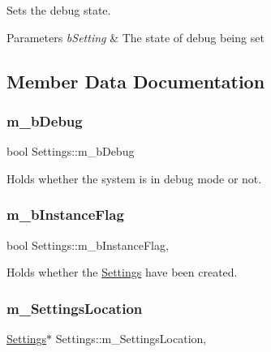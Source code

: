 Sets the debug state. 


\begin{DoxyParams}{Parameters}
{\em b\+Setting} & The state of debug being set \\
\hline
\end{DoxyParams}


\subsection{Member Data Documentation}
\mbox{\label{class_settings_a45f5b31eac0c8566eef1615368d5b893}} 
\subsubsection{\texorpdfstring{m\+\_\+b\+Debug}{m\_bDebug}}
{\footnotesize\ttfamily bool Settings\+::m\+\_\+b\+Debug\hspace{0.3cm}{\ttfamily [private]}}



Holds whether the system is in debug mode or not. 

\mbox{\label{class_settings_ab86ba9c14d4dffa6c2f8df0a1f9b12ed}} 
\subsubsection{\texorpdfstring{m\+\_\+b\+Instance\+Flag}{m\_bInstanceFlag}}
{\footnotesize\ttfamily bool Settings\+::m\+\_\+b\+Instance\+Flag\hspace{0.3cm}{\ttfamily [static]}, {\ttfamily [private]}}



Holds whether the \hyperlink{class_settings}{Settings} have been created. 

\mbox{\label{class_settings_ab20dedb7bb5225046eb13040b4084be6}} 
\subsubsection{\texorpdfstring{m\+\_\+\+Settings\+Location}{m\_SettingsLocation}}
{\footnotesize\ttfamily \hyperlink{class_settings}{Settings}$\ast$ Settings\+::m\+\_\+\+Settings\+Location\hspace{0.3cm}{\ttfamily [static]}, {\ttfamily [private]}}



